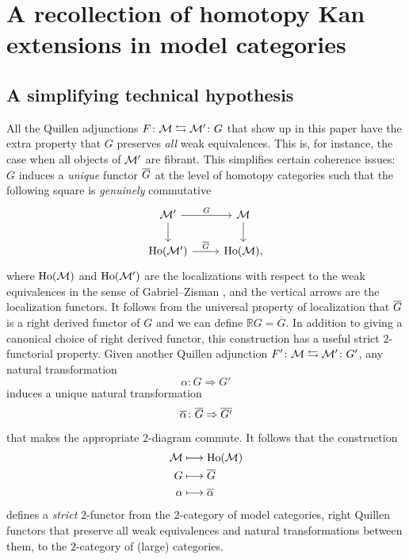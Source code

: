 \section{A recollection of homotopy Kan extensions in model categories}\label{sec:htpykan}
\subsection{A simplifying technical hypothesis}
\begin{paragr}\label{paragr:techyp}
  All the Quillen adjunctions $F \colon \mathcal{M} \leftrightarrows \mathcal{M}' \colon G$
  that show up in this paper have the extra property that $G$
  preserves \emph{all} weak equivalences. This is, for instance, the
  case when all objects of $\mathcal{M}'$ are fibrant.
This simplifies certain coherence issues: $G$ induces a \emph{unique} functor $\overline{G}$ at the level of
  homotopy categories such that the following square is \emph{genuinely}
  commutative
  \[
    \begin{tikzcd} \M' \ar[d] \ar[r,"G"] &
\M\ar[d]\\ \Loc{\M'} \ar[r,"\GZ{G}"] &
\Loc{\M},
    \end{tikzcd}
  \]
  where $\mathrm{Ho}(\mathcal{M})$ and $\mathrm{Ho}(\mathcal{M}')$ are the localizations with respect
  to the weak equivalences in the sense of Gabriel--Zisman \cite{gabrielzisman:calfrh}, and
  the vertical arrows are the localization functors. It follows from
  the universal property of localization that
  $\overline{G}$ is a right derived
  functor of $G$ and we can define $\mathbb{R}G=\overline{G}$. In addition to giving a canonical choice of right derived functor, this construction
  has a useful strict $2$\nbd-functorial property. Given another
  Quillen adjunction $F' \colon \mathcal{M} \leftrightarrows \mathcal{M}' \colon G'$, 
  any natural transformation \[\alpha \colon G \Rightarrow G'\] induces
  a unique natural transformation \[\overline{\alpha} \colon \overline{G}
    \Rightarrow \overline{G'}\]
  that makes the appropriate $2$\nbd-diagram commute. It follows that the
  construction
  \[
    \begin{aligned}
    \mathcal{M} &\longmapsto\mathrm{Ho}(\mathcal{M})\\
    G &\longmapsto\overline{G}\\
    \alpha &\longmapsto\overline{\alpha}\\
  \end{aligned}
\]
defines a \emph{strict} $2$\nbd-functor from the $2$\nbd-category of
  model categories, right Quillen functors that preserve all weak
  equivalences and natural transformations between them, to the
  $2$\nbd-category of (large) categories.


\end{paragr}

